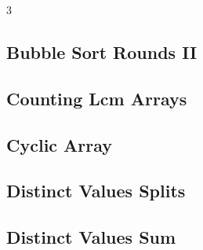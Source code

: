 \documentclass[8pt]{extarticle}
\begin{document}
\begin{multicols*}{3}
\subsection{Bubble Sort Rounds II}
\begin{caixaenunciado}

\end{caixaenunciado}
\vspace{0.3cm}


\subsection{Counting Lcm Arrays}
\begin{caixaenunciado}

\end{caixaenunciado}
\vspace{0.3cm}


\subsection{Cyclic Array}
\begin{caixaenunciado}

\end{caixaenunciado}
\vspace{0.3cm}


\subsection{Distinct Values Splits}
\begin{caixaenunciado}

\end{caixaenunciado}
\vspace{0.3cm}


\subsection{Distinct Values Sum}
\begin{caixaenunciado}

\end{caixaenunciado}
\vspace{0.3cm}



\end{multicols*}
\end{document}
